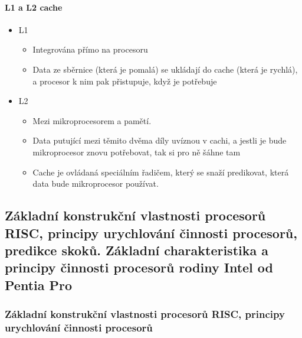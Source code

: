 \documentclass[10pt,a4paper]{article}
\begin{document}
\paragraph{L1 a L2 cache}

\begin{itemize}
\item L1
\begin{itemize}
\item Integrována přímo na procesoru
\item Data ze sběrnice (která je pomalá) se ukládají do cache (která je rychlá), a procesor k nim pak přistupuje, když je potřebuje
\end{itemize}
\item L2
\begin{itemize}
\item Mezi mikroprocesorem a pamětí.
\item Data putující mezi těmito dvěma díly uvíznou v cachi, a jestli je bude mikroprocesor znovu potřebovat, tak si pro ně šáhne tam
\item Cache je ovládaná speciálním řadičem, který se snaží predikovat, která data bude mikroprocesor používat.
\end{itemize}
\end{itemize}
\subsection{Základní konstrukční vlastnosti procesorů RISC, principy urychlování činnosti procesorů, predikce skoků. Základní charakteristika a principy činnosti procesorů rodiny Intel od Pentia Pro}
\subsubsection{Základní konstrukční vlastnosti procesorů RISC, principy urychlování činnosti procesorů}
\end{document}
